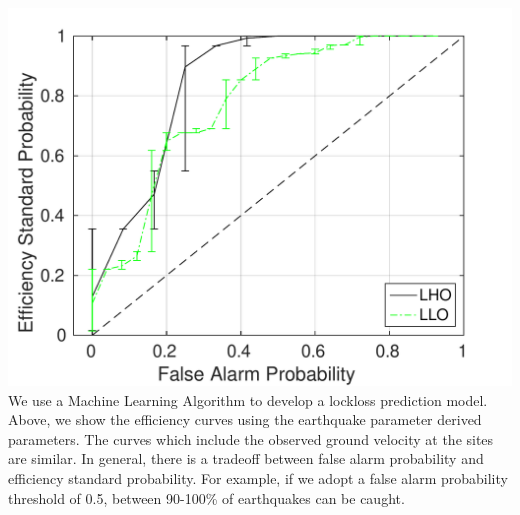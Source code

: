 \documentclass[a0paper,portrait]{baposter}
\begin{document}
\begin{poster}
{ \includegraphics[width=0.99\linewidth]{plots/lockloss_fap_errorbars.pdf}
We use a Machine Learning Algorithm to develop a lockloss prediction model. 
Above, we show the efficiency curves using the earthquake parameter derived parameters. 
The curves which include the observed ground velocity at the sites are similar. 
In general, there is a tradeoff between false alarm probability and efficiency standard probability.
For example, if we adopt a false alarm probability threshold of 0.5, between 90-100\% of earthquakes can be caught.
	
}

\end{poster}
\end{document}
